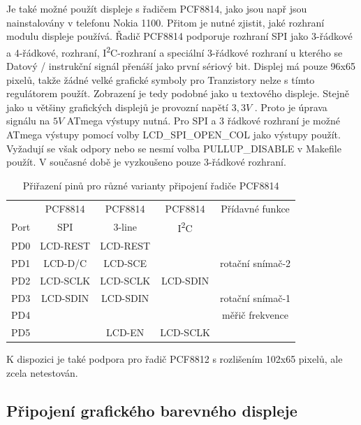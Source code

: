 Je také možné použít displeje s řadičem PCF8814, jako jsou např
jsou nainstalovány v telefonu Nokia 1100. Přitom je nutné zjistit, jaké rozhraní modulu displeje
používá. Řadič PCF8814 podporuje rozhraní SPI jako 3-řádkové a 4-řádkové,
rozhraní, I\textsuperscript{2}C-rozhraní a speciální 3-řádkové rozhraní u kterého se
Datový / instrukční signál přenáší jako první sériový bit.
Displej má pouze 96x65 pixelů, takže žádné velké grafické symboly pro
Tranzistory nelze s tímto regulátorem použít. Zobrazení je tedy podobné jako u textového displeje.
Stejně jako u většiny grafických displejů je provozní napětí \(3,3V\) .
Proto je úprava signálu na \(5V\) ATmega výstupy nutná.
Pro SPI a 3 řádkové rozhraní je možné ATmega výstupy pomocí volby LCD\_SPI\_OPEN\_COL jako
 výstupy použít.
Vyžadují se však  odpory nebo se nesmí volba PULLUP\_DISABLE v Makefile použít.
V současné době je vyzkoušeno pouze 3-řádkové rozhraní.
\begin{table}[H]
  \begin{center}
    \begin{tabular}{| c || c | c | c | c |}
    \hline
           &  PCF8814    & PCF8814        & PCF8814     & Přídavné funkce \\
      Port &    SPI      & 3-line         &   I\textsuperscript{2}C      & \\
    \hline
    \hline
    PD0    &   LCD-REST  & LCD-REST       &            & \\
    \hline
    PD1    &   LCD-D/C   & LCD-SCE        &             & rotační snímač-2 \\
    \hline
    PD2    &   LCD-SCLK  & LCD-SCLK       &  LCD-SDIN   & \\
    \hline
    PD3    &   LCD-SDIN  & LCD-SDIN       &             & rotační snímač-1 \\
    \hline
    PD4    &             &                &             & měřič frekvence \\
    \hline
    PD5    &             & LCD-EN         &   LCD-SCLK  & \\
    \hline
    \end{tabular}
  \end{center}
  \caption{Přiřazení pinů pro různé varianty připojení řadiče PCF8814}
  \label{tab:PCF8814-con}
\end{table}

K dispozici je také podpora pro řadič PCF8812 s rozlišením 102x65 pixelů,
ale zcela netestován.

\subsection{Připojení grafického barevného displeje}

